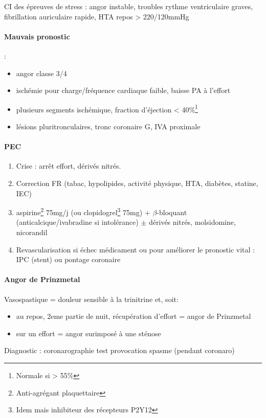 \danger CI des épreuves de stress : angor instable, troubles rythme ventriculaire
graves, fibrillation auriculaire rapide, HTA repos > 220/120mmHg

\paragraph{Mauvais pronostic} : 
\begin{itemize}
  \item angor classe 3/4
  \item ischémie pour charge/fréquence cardiaque faible, baisse PA à l'effort
  \item plusieurs segments ischémique, fraction d'éjection <
    40\%\footnote{Normale si > 55\%}
  \item lésions pluritronculaires, tronc coronaire G, \gls{IVA} proximale
\end{itemize}

\paragraph{PEC}
\begin{enumerate}
\item Crise : arrêt effort, dérivés nitrés.
\item Correction FR (tabac, hypolipides, activité physique, HTA, diabètes, statine,
IEC)
\item aspirine\footnote{Anti-agrégant plaquettaire} 75mg/j (ou
  clopidogrel\footnote{Idem mais inhibiteur des récepteurs P2Y12} 75mg) +
  $\beta$-bloquant (anticalcique/ivabradine si intolérance) $\pm$ {dérivés nitrés, molsidomine,
nicorandil}
\item Revascularisation si échec médicament ou pour améliorer le pronostic vital
  : \gls{IPC} (stent) ou pontage coronaire
\end{enumerate}

\paragraph{Angor de Prinzmetal} Vasospastique = douleur sensible à la trinitrine
et, soit:
\begin{itemize}
  \item au repos, 2eme partie de nuit, récupération d'effort = angor de Prinzmetal
  \item sur un effort = angor surimposé à une sténose
\end{itemize}
Diagnostic : coronarographie \thus test provocation spasme (pendant coronaro)

